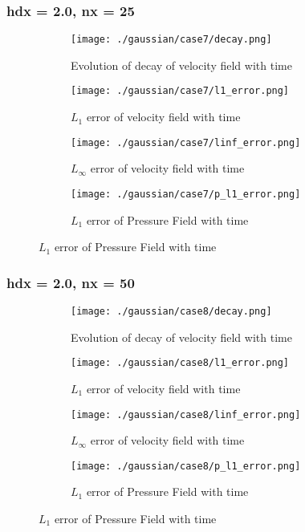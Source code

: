 \documentclass[11pt, a4paper]{article}
\begin{document}
\subsubsection{hdx = 2.0, nx = 25}
\begin{figure}[H]
\begin{subfigure}{0.48\textwidth}
\texttt{[image: ./gaussian/case7/decay.png]}
\caption{Evolution of decay of velocity field with time}
\end{subfigure}
\begin{subfigure}{0.48\textwidth}
\texttt{[image: ./gaussian/case7/l1\_error.png]}
\caption{$L_1$ error of velocity field with time}
\end{subfigure}
\medskip
\begin{subfigure}{0.48\textwidth}
\texttt{[image: ./gaussian/case7/linf\_error.png]}
\caption{$L_\infty$ error of velocity field with time}
\end{subfigure}
\begin{subfigure}{0.48\textwidth}
\texttt{[image: ./gaussian/case7/p\_l1\_error.png]}
\caption{$L_1$ error of Pressure Field with time}
\end{subfigure}
\end{figure}

\subsubsection{hdx = 2.0, nx = 50}
\begin{figure}[H]
\begin{subfigure}{0.48\textwidth}
\texttt{[image: ./gaussian/case8/decay.png]}
\caption{Evolution of decay of velocity field with time}
\end{subfigure}
\begin{subfigure}{0.48\textwidth}
\texttt{[image: ./gaussian/case8/l1\_error.png]}
\caption{$L_1$ error of velocity field with time}
\end{subfigure}
\medskip
\begin{subfigure}{0.48\textwidth}
\texttt{[image: ./gaussian/case8/linf\_error.png]}
\caption{$L_\infty$ error of velocity field with time}
\end{subfigure}
\begin{subfigure}{0.48\textwidth}
\texttt{[image: ./gaussian/case8/p\_l1\_error.png]}
\caption{$L_1$ error of Pressure Field with time}
\end{subfigure}
\end{figure}
\end{document}

